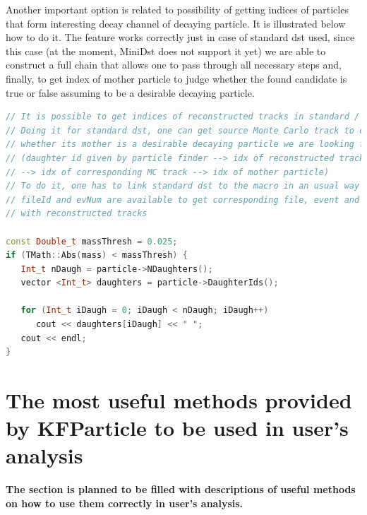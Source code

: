 \documentclass[8pt,a5paper, oldfontcommands]{memoir}
\begin{document}
Another important option is related to possibility of getting indices of particles that form interesting decay channel of decaying particle.
It is illustrated below how to do it. The feature works correctly just in case of standard dst used, since this case (at the moment, MiniDst does not support it yet)
we are able to construct a full chain that allows one to pass through all necessary steps and, finally, to get index of mother particle to judge whether the found candidate is true or false
assuming to be a desirable decaying particle. 

{ \tiny
  \begin{lstlisting}[language=C++,basicstyle=\ttfamily,keywordstyle=\color{red}, commentstyle=\color{blue}]
// It is possible to get indices of reconstructed tracks in standard / MiniDst. 
// Doing it for standard dst, one can get source Monte Carlo track to check 
// whether its mother is a desirable decaying particle we are looking for ...
// (daughter id given by particle finder --> idx of reconstructed track --> 
// --> idx of corresponding MC track --> idx of mother particle)
// To do it, one has to link standard dst to the macro in an usual way 
// fileId and evNum are available to get corresponding file, event and arrays
// with reconstructed tracks 
                       
const Double_t massThresh = 0.025;
if (TMath::Abs(mass) < massThresh) {
   Int_t nDaugh = particle->NDaughters();
   vector <Int_t> daughters = particle->DaughterIds();

   for (Int_t iDaugh = 0; iDaugh < nDaugh; iDaugh++)
      cout << daughters[iDaugh] << " ";
   cout << endl;
}
  \end{lstlisting}
}

\newpage
\section{The most useful methods provided by {\bf \color{red} KFParticle} to be used in user's analysis}
\label{sec}
\thispagestyle{plain}
{\bf The section is planned to be filled with descriptions of useful methods on how to use them correctly in user's analysis.}
\end{document}
